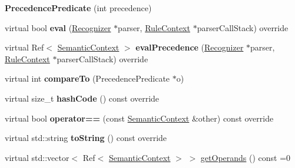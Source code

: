 \begin{DoxyCompactItemize}
{\bfseries Precedence\+Predicate} (int precedence)
\item 
\mbox{\label{classantlr4_1_1atn_1_1SemanticContext_aaf020c5b73a8d0216f8423acd5d4cea8}} 
virtual bool {\bfseries eval} (\hyperlink{classantlr4_1_1Recognizer}{Recognizer} $\ast$parser, \hyperlink{classantlr4_1_1RuleContext}{Rule\+Context} $\ast$parser\+Call\+Stack) override
\item 
\mbox{\label{classantlr4_1_1atn_1_1SemanticContext_a813c90739c89d03f17bf38ae5cbaa3dc}} 
virtual Ref$<$ \hyperlink{classantlr4_1_1atn_1_1SemanticContext}{Semantic\+Context} $>$ {\bfseries eval\+Precedence} (\hyperlink{classantlr4_1_1Recognizer}{Recognizer} $\ast$parser, \hyperlink{classantlr4_1_1RuleContext}{Rule\+Context} $\ast$parser\+Call\+Stack) override
\item 
\mbox{\label{classantlr4_1_1atn_1_1SemanticContext_a8c652840222e22e8fdc4dd348b00a153}} 
virtual int {\bfseries compare\+To} (Precedence\+Predicate $\ast$o)
\item 
\mbox{\label{classantlr4_1_1atn_1_1SemanticContext_a82a09a52cfc8030b1c33f1eaadad539a}} 
virtual size\+\_\+t {\bfseries hash\+Code} () const override
\item 
\mbox{\label{classantlr4_1_1atn_1_1SemanticContext_a1400e1ca84faec671a3756ff0b9f4734}} 
virtual bool {\bfseries operator==} (const \hyperlink{classantlr4_1_1atn_1_1SemanticContext}{Semantic\+Context} \&other) const override
\item 
\mbox{\label{classantlr4_1_1atn_1_1SemanticContext_a2a712638848af9bc2c996bda844eb15b}} 
virtual std\+::string {\bfseries to\+String} () const override
\item 
virtual std\+::vector$<$ Ref$<$ \hyperlink{classantlr4_1_1atn_1_1SemanticContext}{Semantic\+Context} $>$ $>$ \hyperlink{classantlr4_1_1atn_1_1SemanticContext_ae47c3a65cf405cecabf3f9c109ca6690}{get\+Operands} () const =0
\item 
\mbox{\label{classantlr4_1_1atn_1_1SemanticContext_ac490980398ebba9a265420d20fd14764}} 

\end{DoxyCompactItemize}
